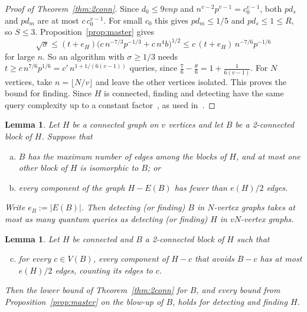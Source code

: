 \documentclass[11pt]{article}
\newtheorem{lemma}[theorem]{Lemma}
\theoremstyle{remark}
\newcommand{\abs}[1]{\lvert #1\rvert}
\begin{document}
\begin{proof}[Proof of Theorem~\ref{thm:2conn}]
Since $d_0\le9vnp$ and $n^{v-2}p^{v-1}=c_0^{v-1}$, both $pd_s$ and $pd_m$ are at most $c\,c_0^{v-1}$. For small $c_0$ this gives $pd_m\le1/5$ and $pd_s\le1\le R$, so $S\le3$. Proposition~\ref{prop:master} gives
\[\sqrt\sigma\le(t+e_H)\bigl(c\,n^{-7/3}p^{-1/3}+c\,n^4b\bigr)^{1/2}\le c\,(t+e_H)\,n^{-7/6}p^{-1/6}\]
for large $n$. So an algorithm with $\sigma\ge1/3$ needs $t\ge c\,n^{7/6}p^{1/6}=c'\,n^{1+1/(6(v-1))}$ queries, since $\frac76-\frac\theta6=1+\frac1{6(v-1)}$. For $N$ vertices, take $n=\lfloor N/v\rfloor$ and leave the other vertices isolated. This proves the bound for finding. Since $H$ is connected, finding and detecting have the same query complexity up to a constant factor~\cite[Lemma~23]{CGP26}, as used in~\cite[Section~2.2]{GZ26}.
\end{proof}

\begin{lemma}\label{lem:blockred}
Let $H$ be a connected graph on $v$ vertices and let $B$ be a 2-connected block of $H$. Suppose that
\begin{enumerate}[(a)]
\item $B$ has the maximum number of edges among the blocks of $H$, and at most one other block of $H$ is isomorphic to $B$; or
\item every component of the graph $H-E(B)$ has fewer than $e(H)/2$ edges.
\end{enumerate}
Write $e_B:=\abs{E(B)}$. Then detecting (or finding) $B$ in $N$-vertex graphs takes at most as many quantum queries as detecting (or finding) $H$ in $vN$-vertex graphs.
\end{lemma}

\begin{lemma}\label{lem:partred}
Let $H$ be connected and $B$ a 2-connected block of $H$ such that
\begin{enumerate}[(a)]\setcounter{enumi}{2}
\item for every $c\in V(B)$, every component of $H-c$ that avoids $B-c$ has at most $e(H)/2$ edges, counting its edges to $c$.
\end{enumerate}
Then the lower bound of Theorem~\ref{thm:2conn} for $B$, and every bound from Proposition~\ref{prop:master} on the blow-up of $B$, holds for detecting and finding $H$.
\end{lemma}
\end{document}
